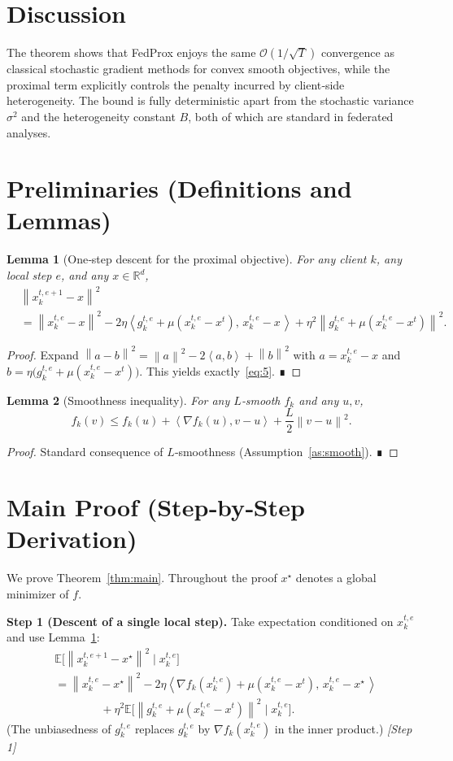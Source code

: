 \documentclass[11pt]{article}
\newtheorem{lemma}{Lemma}
\newcommand{\E}{\mathbb{E}}
\newcommand{\norm}[1]{\left\lVert #1\right\rVert}
\newcommand{\ip}[2]{\left\langle #1,#2\right\rangle}
\begin{document}
\section*{Discussion}
The theorem shows that FedProx enjoys the same $\mathcal{O}(1/\sqrt{T})$ convergence as classical stochastic gradient methods for convex smooth objectives, while the proximal term explicitly controls the penalty incurred by client‑side heterogeneity. The bound is fully deterministic apart from the stochastic variance $\sigma^{2}$ and the heterogeneity constant $B$, both of which are standard in federated analyses.

\newpage
\section*{Preliminaries (Definitions and Lemmas)}
\begin{lemma}[One‑step descent for the proximal objective]\label{lem:descent}
For any client $k$, any local step $e$, and any $x\in\mathbb{R}^{d}$,
\[
\begin{aligned}
&\norm{x_{k}^{t,e+1}-x}^{2}\\
&= \norm{x_{k}^{t,e}-x}^{2}
-2\eta\ip{g_{k}^{t,e}+\mu(x_{k}^{t,e}-x^{t})}{\,x_{k}^{t,e}-x\,}
+\eta^{2}\norm{g_{k}^{t,e}+\mu(x_{k}^{t,e}-x^{t})}^{2}.
\end{aligned}
\tag{5}
\]
\end{lemma}
\begin{proof}
Expand $\norm{a-b}^{2}=\norm{a}^{2}-2\ip{a}{b}+\norm{b}^{2}$ with $a=x_{k}^{t,e}-x$ and $b=\eta\big(g_{k}^{t,e}+\mu(x_{k}^{t,e}-x^{t})\big)$.  This yields exactly~\eqref{eq:5}.  ∎
\end{proof}
\begin{lemma}[Smoothness inequality]\label{lem:smooth}
For any $L$‑smooth $f_k$ and any $u,v$,
\[
f_k(v)\le f_k(u)+\ip{\nabla f_k(u)}{v-u}+\frac{L}{2}\norm{v-u}^{2}.
\tag{6}
\]
\end{lemma}
\begin{proof}
Standard consequence of $L$‑smoothness (Assumption~\ref{as:smooth}). ∎
\end{proof}

\section*{Main Proof (Step‑by‑Step Derivation)}
We prove Theorem~\ref{thm:main}.  Throughout the proof $x^{\star}$ denotes a global minimizer of $f$.

\noindent\textbf{Step 1 (Descent of a single local step).}  
Take expectation conditioned on $x_{k}^{t,e}$ and use Lemma~\ref{lem:descent}:
\[
\begin{aligned}
&\E\!\big[\norm{x_{k}^{t,e+1}-x^{\star}}^{2}\mid x_{k}^{t,e}\big]\\
&= \norm{x_{k}^{t,e}-x^{\star}}^{2}
-2\eta\ip{\nabla f_k(x_{k}^{t,e})+\mu(x_{k}^{t,e}-x^{t})}{\,x_{k}^{t,e}-x^{\star}\,}\\
&\qquad\qquad
+\eta^{2}\E\!\big[\norm{g_{k}^{t,e}+\mu(x_{k}^{t,e}-x^{t})}^{2}\mid x_{k}^{t,e}\big].
\end{aligned}
\tag{7}
\]
(The unbiasedness of $g_{k}^{t,e}$ replaces $g_{k}^{t,e}$ by $\nabla f_k(x_{k}^{t,e})$ in the inner product.)  \hfill\textit{[Step 1]}
\end{document}
